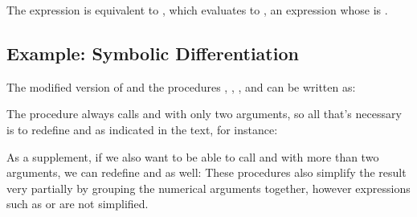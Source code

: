 \begin{exe}[2.55]
    The expression  is equivalent to
    , which evaluates to
    , an expression whose  is .
\end{exe}

\subsection{Example: Symbolic Differentiation}

\begin{exe}[2.56]
    \label{2.56}
    The modified version of  and the procedures 
    , , , and 
     can be written as:
\end{exe}

\begin{exe}[2.57]
    The  procedure always calls  and 
     with only two arguments, so all that’s necessary is to 
    redefine  and  as indicated in the text, for 
    instance:

    As a supplement, if we also want to be able to call  and 
     with more than two arguments, we can redefine 
     and  as well:
    These procedures also simplify the result very partially by grouping the 
    numerical arguments together, however expressions such as
     or
     are not simplified.
\end{exe}

